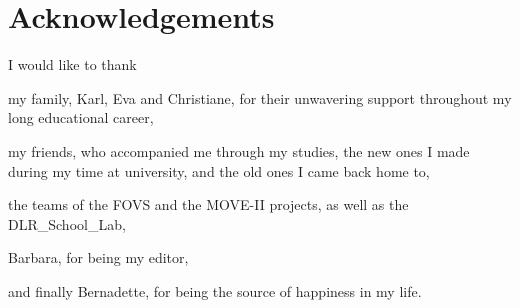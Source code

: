 \cleardoublepage

\hspace{2.5cm}
\section*{Acknowledgements}

I would like to thank

my family, Karl, Eva and Christiane, for their unwavering support throughout my long educational career,

my friends, who accompanied me through my studies, the new ones I made during my time at university, and the old ones I came back home to,

the teams of the FOVS and the MOVE-II projects, as well as the DLR\_School\_Lab,

Barbara, for being my editor,

and finally Bernadette, for being the source of happiness in my life.

